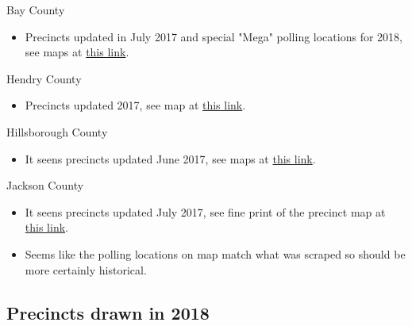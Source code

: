 \documentclass[12pt]{article}
\begin{document}
Bay County
\begin{itemize}
  \item Precincts updated in July 2017 and special "Mega" polling locations for 2018, see maps at \href{https://www.bayvotes.org/Voter-Info/Maps-and-Boundaries}{this link}.
\end{itemize}
Hendry County
\begin{itemize}
  \item Precincts updated 2017, see map at \href{https://www.hendryelections.org/Portals/Hendry/2016-2018%20Precincts.pdf}{this link}.
\end{itemize}
Hillsborough County
\begin{itemize}
  \item It seens precincts updated June 2017, see maps at \href{https://www.votehillsborough.org/RESEARCH-DATA/MAPS-DISTRICTS-HBC-Indivudual-Maps}{this link}.
\end{itemize}
Jackson County
\begin{itemize}
  \item It seens precincts updated July 2017, see fine print of the precinct map at \href{https://www.jacksoncountysoe.org/Portals/Jackson/Documents/Accessibility%20PDF%20Fixes/Current_Precincts_07_18_2017FIXED.pdf?ver=2019-01-24-084548-780}{this link}.
  \item Seems like the polling locations on map match what was scraped so should be more certainly historical.
\end{itemize}


\clearpage

\subsection{Precincts drawn in 2018}
\end{document}
